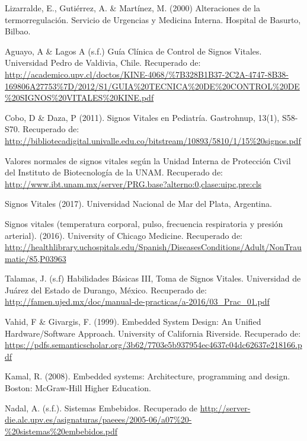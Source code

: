 \begin{thebibliography}{0}
	 Lizarralde, E., Gutiérrez, A. \& Martínez, M. (2000) Alteraciones de la termorregulación. Servicio de Urgencias y Medicina Interna. Hospital de Basurto, Bilbao.
	
	
	 Aguayo, A \& Lagos A (s.f.) Guía Clínica de Control de Signos Vitales. Universidad Pedro de Valdivia, Chile. Recuperado de: \url{http://academico.upv.cl/doctos/KINE-4068/\%7B328B1B37-2C2A-4747-8B38-169806A27753%7D/2012/S1/GUIA%20TECNICA%20DE%20CONTROL%20DE%20SIGNOS%20VITALES%20KINE.pdf}
	
	 Cobo, D \& Daza, P (2011). Signos Vitales en Pediatría. Gastrohnup, 13(1), S58-S70. Recuperado de: \url{http://bibliotecadigital.univalle.edu.co/bitstream/10893/5810/1/15%20signos.pdf} 
	
	 Valores normales de signos vitales según la Unidad Interna de Protección Civil del Instituto de Biotecnología de la UNAM. Recuperado de: \url{http://www.ibt.unam.mx/server/PRG.base?alterno:0,clase:uipc,pre:cls}
	
	 Signos Vitales (2017). Universidad Nacional de Mar del Plata, Argentina. 
	
	 Signos vitales (temperatura corporal, pulso, frecuencia respiratoria y presión arterial). (2016). University of Chicago Medicine. Recuperado de: \url{http://healthlibrary.uchospitals.edu/Spanish/DiseasesConditions/Adult/NonTraumatic/85,P03963}
	
	 Talamas, J. (s.f) Habilidades Básicas III, Toma de Signos Vitales. Universidad de Juárez del Estado de Durango, México. Recuperado de: \url{http://famen.ujed.mx/doc/manual-de-practicas/a-2016/03_Prac_01.pdf}
	
		Vahid, F \& Givargis, F. (1999). Embedded System Design: An Unified Hardware/Software Approach. University of California Riverside. Recuperado de: \url{https://pdfs.semanticscholar.org/3b62/7703e5b937954ec4637c04dc62637e218166.pdf}
	
	 Kamal, R. (2008). Embedded systems: Architecture, programming and design. Boston: McGraw-Hill Higher Education.
	
	 Nadal, A. (s.f.). Sistemas Embebidos. Recuperado de  \url{http://server-die.alc.upv.es/asignaturas/paeees/2005-06/a07%20-%20sistemas%20embebidos.pdf}
	

\end{thebibliography}
